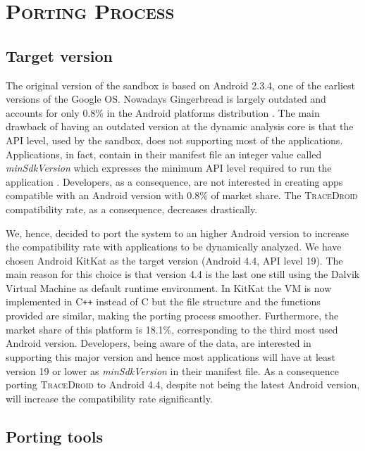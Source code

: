 \section{\textsc{Porting Process}}
\label{sec:porting_process}

\subsection{Target version}
\label{sec:target_version}

The original version of the sandbox is based on Android 2.3.4, one of
the earliest versions of the Google OS. Nowadays Gingerbread is
largely outdated and accounts for only 0.8\% in the Android platforms
distribution \cite{ref16}. The main drawback of having an outdated version at
the dynamic analysis core is that the API level, used by the sandbox,
does not supporting most of the applications. Applications, in fact,
contain in their manifest file an integer value called \textit{minSdkVersion}
which expresses the minimum API level required to run the application
\cite{ref17}. Developers, as a consequence, are not interested in creating
apps compatible with an Android version with 0.8\% of
market share. The \textsc{TraceDroid} compatibility rate, as a consequence,
decreases drastically.

We, hence, decided to port the system to an higher Android version to
increase the compatibility rate with applications to be dynamically
analyzed. We have chosen Android KitKat as the target version (Android
4.4, API level 19). The main reason for this choice is that version
4.4 is the last one still using the Dalvik Virtual Machine as default
runtime environment. In KitKat the VM is now implemented in
C{}\verb!++! instead of C but the file structure and the functions
provided are similar, making the porting process
smoother. Furthermore, the market share of this platform is
18.1\%, corresponding to the third most used Android version. Developers,
being aware of the data, are interested in supporting this major
version and hence most applications will have at least version 19 or
lower as \textit{minSdkVersion} in their manifest file. As a
consequence porting \textsc{TraceDroid} to Android 4.4, despite not
being the latest Android version, will increase the compatibility rate
significantly.

\subsection{Porting tools}
\label{sec:porting_tools}

